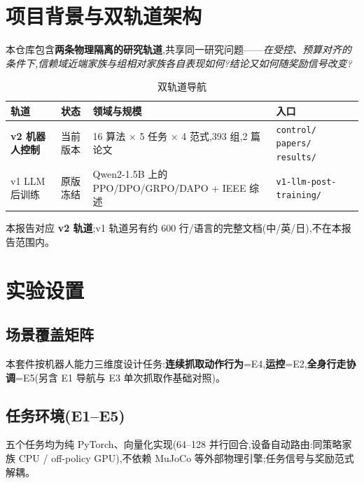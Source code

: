 \documentclass[11pt,a4paper]{ctexart}
\begin{document}
\section{项目背景与双轨道架构}

本仓库包含\textbf{两条物理隔离的研究轨道},共享同一研究问题——\emph{在受控、预算对齐的条件下,信赖域近端家族与组相对家族各自表现如何?结论又如何随奖励信号改变?}

\begin{table}[H]
\centering
\caption{双轨道导航}
\small
\begin{tabular}{l l p{4.6cm} p{4.4cm}}
\toprule
轨道 & 状态 & 领域与规模 & 入口 \\
\midrule
\textbf{v2 机器人控制} & 当前版本 & 16 算法 $\times$ 5 任务 $\times$ 4 范式,393 组,2 篇论文 & \texttt{control/} \texttt{papers/} \texttt{results/} \\
v1 LLM 后训练 & 原版冻结 & Qwen2-1.5B 上的 PPO/DPO/GRPO/DAPO + IEEE 综述 & \texttt{v1-llm-post-training/} \\
\bottomrule
\end{tabular}
\end{table}

本报告对应 \textbf{v2 轨道};v1 轨道另有约 600 行/语言的完整文档(中/英/日),不在本报告范围内。

\section{实验设置}

\subsection{场景覆盖矩阵}

本套件按机器人能力三维度设计任务:\textbf{连续抓取动作行为}=E4,\textbf{运控}=E2,\textbf{全身行走协调}=E5(另含 E1 导航与 E3 单次抓取作基础对照)。

\subsection{任务环境(E1--E5)}

五个任务均为纯 PyTorch、向量化实现(64--128 并行回合,设备自动路由:同策略家族 CPU / off-policy GPU),不依赖 MuJoCo 等外部物理引擎;任务信号与奖励范式解耦。
\end{document}
